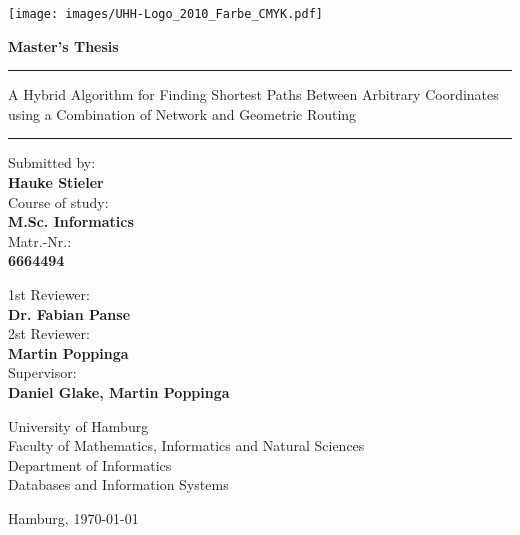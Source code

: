
\pagenumbering{}

\begin{titlepage}
	
	\texttt{[image: images/UHH-Logo\_2010\_Farbe\_CMYK.pdf]}
	\vspace{1cm}
	
	\begin{center}
		
		{
			\Large
			\textbf{Master's Thesis}
			\par
		}
		
		\vspace{1.5cm}
		\hrule
		\vspace{1cm}
		
		{
			\titlefont
			\huge
			A Hybrid Algorithm for Finding Shortest Paths Between Arbitrary Coordinates using a Combination of Network and Geometric Routing
			\par
		}
		
		\vspace{1cm}
		\hrule
		\vspace{1.5cm}
	\end{center}
	
	\begin{multicols}{2}
		\raggedright
		Submitted by:\\
		\textbf{Hauke Stieler}\\[1ex]
		Course of study:\\
		\textbf{M.Sc. Informatics}\\[1ex]
		Matr.-Nr.:\\
		\textbf{6664494}
		
		\columnbreak
		\raggedleft
		
		1st Reviewer:\\
		\textbf{Dr. Fabian Panse}\\[1ex]
		2st Reviewer:\\
		\textbf{Martin Poppinga}\\[1ex]
		Supervisor:\\
		\textbf{Daniel Glake, Martin Poppinga}
	\end{multicols}

	\vspace{0.5cm}

	\begin{center}
		\vfill
		
		University of Hamburg\\
		Faculty of Mathematics, Informatics and Natural Sciences\\
		Department of Informatics\\
		Databases and Information Systems
		
		\vspace{1cm}
		
		Hamburg, \today
	\end{center}
\end{titlepage}

\restoregeometry
